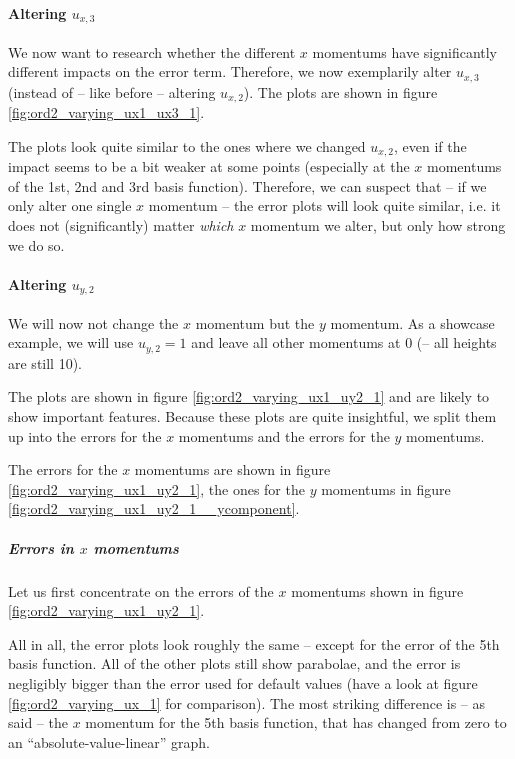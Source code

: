 \documentclass{article}
\begin{document}
\paragraph{\texorpdfstring{Altering $u_{x,3}$}{Altering ux3}}

We now want to research whether the different $x$ momentums have significantly different impacts on the error term. Therefore, we now exemplarily alter $u_{x,3}$ (instead of -- like before -- altering $u_{x,2}$). The plots are shown in figure \ref{fig:ord2_varying_ux1_ux3_1}.



The plots look quite similar to the ones where we changed $u_{x,2}$, even if the impact seems to be a bit weaker at some points (especially at the $x$ momentums of the 1st, 2nd and 3rd basis function). Therefore, we can suspect that -- if we only alter one single $x$ momentum -- the error plots will look quite similar, i.e. it does not (significantly) matter \emph{which} $x$ momentum we alter, but only how strong we do so.

\paragraph{\texorpdfstring{Altering $u_{y,2}$}{Altering uy2}}

We will now not change the $x$ momentum but the $y$ momentum. As a showcase example, we will use $u_{y,2}=1$ and leave all other momentums at 0 (-- all heights are still 10).

The plots are shown in figure \ref{fig:ord2_varying_ux1_uy2_1} and are likely to show important features. Because these plots are quite insightful, we split them up into the errors for the $x$ momentums and the errors for the $y$ momentums.

The errors for the $x$ momentums are shown in figure \ref{fig:ord2_varying_ux1_uy2_1}, the ones for the $y$ momentums in figure \ref{fig:ord2_varying_ux1_uy2_1__ycomponent}.

\subparagraph{\texorpdfstring{Errors in $x$ momentums}{Errors in x momentums}}

Let us first concentrate on the errors of the $x$ momentums shown in figure \ref{fig:ord2_varying_ux1_uy2_1}.



All in all, the error plots look roughly the same -- except for the error of the 5th basis function. All of the other plots still show parabolae, and the error is negligibly bigger than the error used for default values (have a look at figure \ref{fig:ord2_varying_ux_1} for comparison). The most striking difference is -- as said -- the $x$ momentum for the 5th basis function, that has changed from zero to an ``absolute-value-linear'' graph.
\end{document}
